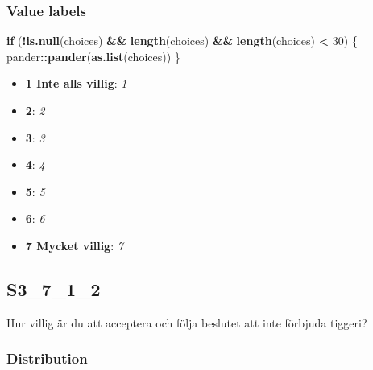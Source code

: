 \documentclass[]{book}
\newenvironment{Shaded}{\begin{snugshade}}{\end{snugshade}}
\newcommand{\KeywordTok}[1]{\textcolor[rgb]{0.13,0.29,0.53}{\textbf{#1}}}
\newcommand{\DecValTok}[1]{\textcolor[rgb]{0.00,0.00,0.81}{#1}}
\newcommand{\StringTok}[1]{\textcolor[rgb]{0.31,0.60,0.02}{#1}}
\newcommand{\ControlFlowTok}[1]{\textcolor[rgb]{0.13,0.29,0.53}{\textbf{#1}}}
\newcommand{\OperatorTok}[1]{\textcolor[rgb]{0.81,0.36,0.00}{\textbf{#1}}}
\newcommand{\NormalTok}[1]{#1}
\providecommand{\tightlist}{%
  \setlength{\itemsep}{0pt}\setlength{\parskip}{0pt}}
\begin{document}
\subsubsection{Value labels}\label{S3_7_1_1_labels}

\begin{Shaded}
\begin{Highlighting}[]
\ControlFlowTok{if}\NormalTok{ (}\OperatorTok{!}\KeywordTok{is.null}\NormalTok{(choices) }\OperatorTok{&&}\StringTok{ }\KeywordTok{length}\NormalTok{(choices) }\OperatorTok{&&}\StringTok{ }\KeywordTok{length}\NormalTok{(choices) }\OperatorTok{<}\StringTok{ }\DecValTok{30}\NormalTok{) \{}
\NormalTok{    pander}\OperatorTok{::}\KeywordTok{pander}\NormalTok{(}\KeywordTok{as.list}\NormalTok{(choices))}
\NormalTok{\}}
\end{Highlighting}
\end{Shaded}

\begin{itemize}
\tightlist
\item
  \textbf{1 Inte alls villig}: \emph{1}
\item
  \textbf{2}: \emph{2}
\item
  \textbf{3}: \emph{3}
\item
  \textbf{4}: \emph{4}
\item
  \textbf{5}: \emph{5}
\item
  \textbf{6}: \emph{6}
\item
  \textbf{7 Mycket villig}: \emph{7}
\end{itemize}

\subsection{S3\_7\_1\_2}\label{S3_7_1_2}

Hur villig är du att acceptera och följa beslutet att inte förbjuda
tiggeri?

\subsubsection{Distribution}\label{S3_7_1_2_distribution}
\end{document}
